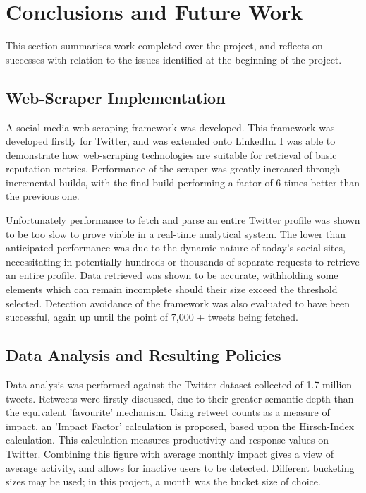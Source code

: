 \chapter{Conclusions and Future Work}\label{C:us}

This section summarises work completed over the project, and reflects on successes with relation to the issues identified at the beginning of the project.


\section{Web-Scraper Implementation}

A social media web-scraping framework was developed. This framework was developed firstly for Twitter, and was extended onto LinkedIn. I was able to demonstrate how web-scraping technologies are suitable for retrieval of basic reputation metrics. Performance of the scraper was greatly increased through incremental builds, with the final build performing a factor of 6 times better than the previous one.

Unfortunately performance to fetch and parse an entire Twitter profile was shown to be too slow to prove viable in a real-time analytical system. The lower than anticipated performance was due to the dynamic nature of today's social sites, necessitating in potentially hundreds or thousands of separate requests to retrieve an entire profile. Data retrieved was shown to be accurate, withholding some elements which can remain incomplete should their size exceed the threshold selected. Detection avoidance of the framework was also evaluated to have been successful, again up until the point of 7,000 + tweets being fetched. 

\section{Data Analysis and Resulting Policies}

Data analysis was performed against the Twitter dataset collected of 1.7 million tweets. Retweets were firstly discussed, due to their greater semantic depth than the equivalent 'favourite' mechanism. Using retweet counts as a measure of impact, an 'Impact Factor' calculation is proposed, based upon the Hirsch-Index calculation. This calculation measures productivity and response values on Twitter. Combining this figure with average monthly impact gives a view of average activity, and allows for inactive users to be detected. Different bucketing sizes may be used; in this project, a month was the bucket size of choice. 

